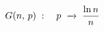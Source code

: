 \documentclass[preview]{standalone}
\begin{document}
\begin{align*}
\special{dvisvgm:raw <g id='unique000'>}G(n,\,p)\;:\quad p \;\xrightarrow{\;\;}\; \frac{\ln n}{n}\special{dvisvgm:raw </g>}
\end{align*}
\end{document}

